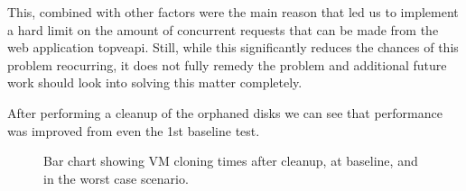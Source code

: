        This, combined with other factors were the main reason that led us to implement a hard limit on the amount of concurrent 
        requests that can be made from the web application to\ac{pve}\ac{api}. Still, while this significantly reduces the chances 
        of this problem reocurring, it does not fully remedy the problem and additional future work should look into solving this 
        matter completely.

        After performing a cleanup of the orphaned disks we can see that performance was improved from even the 1st baseline test.

        \begin{figure}[h]
        \centering
        \caption{Bar chart showing VM cloning times after cleanup, at baseline, and in the worst case scenario.}
        \label{fig:vm_grouped_cloning_focus}
        \end{figure}





